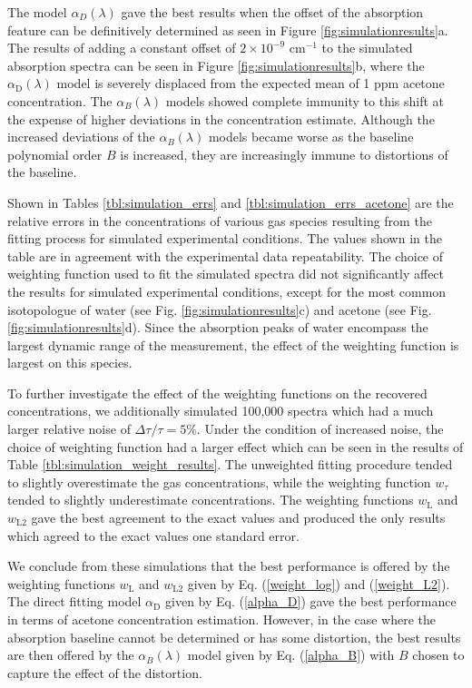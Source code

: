 \documentclass[12pt]{report}
\begin{document}
	The model $\alpha_D(\lambda)$ gave the best results when the offset of the absorption feature can be definitively determined as seen in Figure \ref{fig:simulationresults}a. The results of adding a constant offset of $2\times 10^{-9}$ cm$^{-1}$ to the simulated absorption spectra can be seen in Figure \ref{fig:simulationresults}b, where the $\alpha_\mathrm{D}(\lambda)$ model is severely displaced from the expected mean of 1 ppm acetone concentration. The $\alpha_B(\lambda)$ models showed complete immunity to this shift at the expense of higher deviations in the concentration estimate. Although the increased deviations of the $\alpha_B(\lambda)$ models became worse as the baseline polynomial order $B$ is increased, they are increasingly immune to distortions of the baseline.
	
	Shown in Tables \ref{tbl:simulation_errs} and \ref{tbl:simulation_errs_acetone} are the relative errors in the concentrations of various gas species resulting from the fitting process for simulated experimental conditions. The values shown in the table are in agreement with the experimental data repeatability. The choice of weighting function used to fit the simulated spectra did not significantly affect the results for simulated experimental conditions, except for the most common isotopologue of water (see Fig. \ref{fig:simulationresults}c) and acetone (see Fig. \ref{fig:simulationresults}d). Since the absorption peaks of water encompass the largest dynamic range of the measurement, the effect of the weighting function is largest on this species.
	
	To further investigate the effect of the weighting functions on the recovered concentrations, we additionally simulated 100,000 spectra which had a much larger relative noise of $\Delta \tau /\tau = 5\%$. Under the condition of increased noise, the choice of weighting function had a larger effect which can be seen in the results of Table \ref{tbl:simulation_weight_results}. The unweighted fitting procedure tended to slightly overestimate the gas concentrations, while the weighting function $w_\tau$ tended to slightly underestimate concentrations. The weighting functions $w_\mathrm{L}$ and $w_\mathrm{L2}$ gave the best agreement to the exact values and produced the only results which agreed to the exact values one standard error. 
	
	We conclude from these simulations that the best performance is offered by the weighting functions $w_\mathrm{L}$ and $w_\mathrm{L2}$ given by Eq. (\ref{weight_log}) and (\ref{weight_L2}). The direct fitting model $\alpha_\mathrm{D}$ given by Eq. (\ref{alpha_D}) gave the best performance in terms of acetone concentration estimation. However, in the case where the absorption baseline cannot be determined or has some distortion, the best results are then offered by the $\alpha_B(\lambda)$ model given by Eq. (\ref{alpha_B}) with $B$ chosen to capture the effect of the distortion.
	
\end{document}
